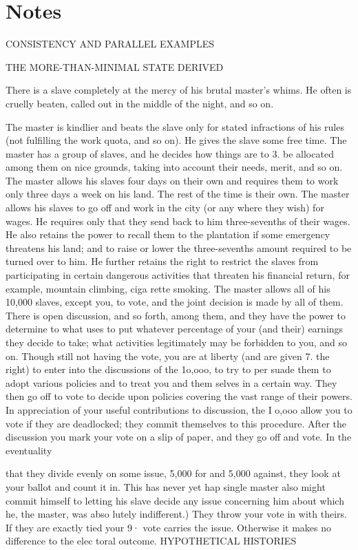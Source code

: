 \documentclass[11pt,openany]{book}
\newcommand{\booknoteshead}{%
  \phantomsection\section*{Notes}%
  \addcontentsline{toc}{section}{Notes}\markright{Notes}}
\begin{document}
\booknoteshead

{\footnotesize\setlength{\parindent}{0pt}\setlength{\parskip}{5pt}

CONSISTENCY AND PARALLEL EXAMPLES\par

THE MORE-THAN-MINIMAL STATE DERIVED\par

There is a slave completely at the mercy of his brutal master's whims. He often is cruelly beaten, called out in the middle of the night, and so on.\par

The master is kindlier and beats the slave only for stated infractions of his rules (not fulfilling the work quota, and so on). He gives the slave some free time. The master has a group of slaves, and he decides how things are to 3. be allocated among them on nice grounds, taking into account their needs, merit, and so on. The master allows his slaves four days on their own and requires them to work only three days a week on his land. The rest of the time is their own. The master allows his slaves to go off and work in the city (or any where they wish) for wages. He requires only that they send back to him three-sevenths of their wages. He also retains the power to recall them to the plantation if some emergency threatens his land; and to raise or lower the three-sevenths amount required to be turned over to him. He further retains the right to restrict the slaves from participating in certain dangerous activities that threaten his financial return, for example, mountain climbing, ciga rette smoking. The master allows all of his 10,000 slaves, except you, to vote, and the joint decision is made by all of them. There is open discussion, and so forth, among them, and they have the power to determine to what uses to put whatever percentage of your (and their) earnings they decide to take; what activities legitimately may be forbidden to you, and so on. Though still not having the vote, you are at liberty (and are given 7. the right) to enter into the discussions of the 1o,ooo, to try to per suade them to adopt various policies and to treat you and them selves in a certain way. They then go off to vote to decide upon policies covering the vast range of their powers. In appreciation of your useful contributions to discussion, the I o,ooo allow you to vote if they are deadlocked; they commit themselves to this procedure. After the discussion you mark your vote on a slip of paper, and they go off and vote. In the eventuality\par

that they divide evenly on some issue, 5,000 for and 5,000 against, they look at your ballot and count it in. This has never yet hap single master also might commit himself to letting his slave decide any issue concerning him about which he, the master, was abso lutely indifferent.) They throw your vote in with theirs. If they are exactly tied your 9· vote carries the issue. Otherwise it makes no difference to the elec toral outcome. HYPOTHETICAL HISTORIES\par

}
\end{document}
